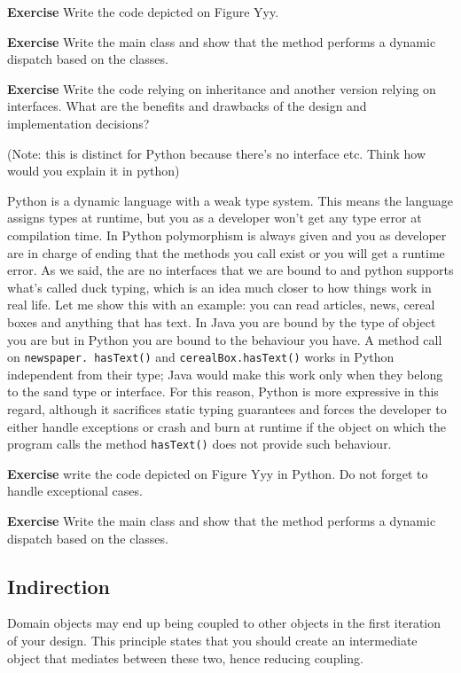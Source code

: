 \documentclass[]{article}
\begin{document}
\textbf{Exercise} Write the code depicted on Figure Yyy.

\textbf{Exercise} Write the main class and show that the method performs
a dynamic dispatch based on the classes.

\textbf{Exercise} Write the code relying on inheritance and another
version relying on interfaces. What are the benefits and drawbacks of
the design and implementation decisions?

(Note: this is distinct for Python because there's no interface etc.
Think how would you explain it in python)

Python is a dynamic language with a weak type system. This means the
language assigns types at runtime, but you as a developer won't get any
type error at compilation time. In Python polymorphism is always given
and you as developer are in charge of ending that the methods you call
exist or you will get a runtime error. As we said, the are no interfaces
that we are bound to and python supports what's called duck typing,
which is an idea much closer to how things work in real life. Let me
show this with an example: you can read articles, news, cereal boxes and
anything that has text. In Java you are bound by the type of object you
are but in Python you are bound to the behaviour you have. A method call
on \texttt{newspaper.\ hasText()} and \texttt{cerealBox.hasText()} works
in Python independent from their type; Java would make this work only
when they belong to the sand type or interface. For this reason, Python
is more expressive in this regard, although it sacrifices static typing
guarantees and forces the developer to either handle exceptions or crash
and burn at runtime if the object on which the program calls the method
\texttt{hasText()} does not provide such behaviour.

\textbf{Exercise} write the code depicted on Figure Yyy in Python. Do
not forget to handle exceptional cases.

\textbf{Exercise} Write the main class and show that the method performs
a dynamic dispatch based on the classes.

\subsection{Indirection}\label{indirection}

Domain objects may end up being coupled to other objects in the first
iteration of your design. This principle states that you should create
an intermediate object that mediates between these two, hence reducing
coupling.
\end{document}
